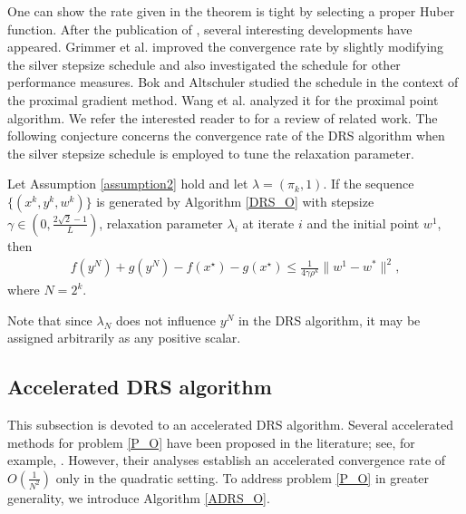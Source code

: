 \documentclass[ijoc,sglanonrev]{informs4}
\begin{document}
One can show the rate given in the theorem is tight by selecting a proper Huber function. After the publication of \cite{altschuler2025acceleration}, several interesting developments have appeared. 
Grimmer et al.\cite{grimmer2025accelerated} improved the convergence rate by slightly modifying the silver stepsize schedule and also investigated the schedule for other performance measures. 
Bok and Altschuler \cite{bok2025optimized} studied the schedule in the context of the proximal gradient method. Wang et al.\cite{wang2024relaxed} analyzed it for the proximal point algorithm. 
We refer the interested reader to \cite{bok2025optimized} for a review of related work. The following conjecture concerns the convergence rate of the DRS algorithm when the silver stepsize schedule is employed to tune the relaxation parameter.



\begin{conjecture} \label{Conjecture_2}
Let Assumption \ref{assumption2} hold and let $\lambda=(\pi_k,  1)$. If the sequence $\{(x^k, y^k, w^k)\}$ is generated by Algorithm \ref{DRS_O} with stepsize $\gamma\in (0, \tfrac{2\sqrt{2}-1}{L})$, relaxation parameter $\lambda_i$ at iterate $i$ and  the initial point $w^1$, then 
\begin{align*}
 f(y^N)+g(y^N) - f(x^\star)-g(x^\star) \leq \frac{1}{4\gamma\rho^k}\|w^1 - w^*\|^2,
\end{align*}
where $N=2^k$.
\end{conjecture}

Note that since $\lambda_N$ does not influence $y^N$ in the DRS algorithm, it may be assigned arbitrarily as any positive scalar.

\subsection{Accelerated DRS algorithm}
This subsection is devoted to an accelerated DRS algorithm. Several accelerated methods for problem \eqref{P_O} have been proposed in the literature; see, for example, \cite{goldstein2014fast, patrinos2014douglas}. However, their analyses establish an accelerated convergence rate of $O(\tfrac{1}{N^2})$ only in the quadratic setting. To address problem \eqref{P_O} in greater generality, we introduce Algorithm \ref{ADRS_O}.
\end{document}
